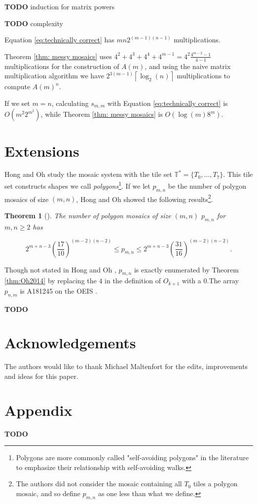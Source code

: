 \documentclass[12pt]{article}
\theoremstyle{plain}
\newtheorem{thm}{Theorem}[section]
\theoremstyle{definition}
\theoremstyle{remark}
\theoremstyle{definition}
\begin{document}
\textbf{TODO} induction for matrix powers


\textbf{TODO} complexity 

Equation \ref{eq:technically correct} has $mn 2^{(m-1)(n-1)}$ multiplications.

Theorem \ref{thm: messy mosaics} uses $4^2 + 4^3 + 4^4 + 4^{m-1} = 4^2 \frac{4^{m-2}-1}{4-1}$ multiplications for the construction of $A(m)$, and using the naive matrix multiplication algorithm we have ${2^{3(m-1)}}\left\lceil \log_2(n) \right\rceil$ multiplications to compute $A(m)^n$.

If we set $m=n$, calculating $s_{m,m}$ with Equation \ref{eq:technically correct} is $O(m^2 2^{m^2})$, while Theorem \ref{thm: messy mosaics} is $O(\log(m)8^m)$.

\section{Extensions}
\label{section: Extensions}

Hong and Oh \cite{Hong2018} study the mosaic system with the tile set $\mathbb{T}^* = \{T_0, \dots,T_7\}$. This tile set constructs shapes we call \textit{polygons}\footnote{Polygons are more commonly called "self-avoiding polygons" in the literature to emphasize their relationship with self-avoiding walks.}. If we let $p_{m,n}$ be the number of polygon mosaics of size $(m,n)$, Hong and Oh showed the following results\footnote{The authors did not consider the mosaic containing all $T_0$ tiles a polygon mosaic, and so define $p_{m,n}$ as one less than what we define.}. 

\begin{thm}[\cite{Hong2018}]
    \label{thm:Hong2018}
    The number of polygon mosaics of size $(m,n)$ $p_{m,n}$ for $m,n \geq 2$ has

    $$2^{m+n-3} \left(\frac{17}{10}\right)^{(m-2)(n-2)} \leq p_{m,n} \leq 2^{m+n-3} \left(\frac{31}{16}\right)^{(m-2)(n-2)}.$$
\end{thm}

Though not stated in Hong and Oh \cite{Hong2018}, $p_{m,n}$ is exactly enumerated by Theorem \ref{thm:Oh2014} by replacing the $4$ in the definition of $O_{k+1}$ with a $0$.The array $p_{n,m}$ is A181245 on the OEIS \cite[OEIS]{oeis}. 

\textbf{TODO}

\section{Acknowledgements}

The authors would like to thank Michael Maltenfort for the edits, improvements and ideas for this paper. 

\newpage

\printbibliography

\section{Appendix}

\textbf{TODO}
\end{document}
